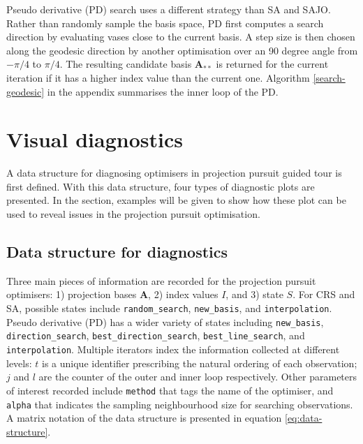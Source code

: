 Pseudo derivative (PD) search \citep{cook1995grand} uses a different
strategy than SA and SAJO. Rather than randomly sample the basis space,
PD first computes a search direction by evaluating vases close to the
current basis. A step size is then chosen along the geodesic direction
by another optimisation over an 90 degree angle from \(-\pi/4\) to
\(\pi/4\). The resulting candidate basis \(\mathbf{A}_{**}\) is returned
for the current iteration if it has a higher index value than the
current one. Algorithm \ref{search-geodesic} in the appendix summarises
the inner loop of the PD.

\hypertarget{vis-diag}{%
\section{Visual diagnostics}\label{vis-diag}}

A data structure for diagnosing optimisers in projection pursuit guided
tour is first defined. With this data structure, four types of
diagnostic plots are presented. In the section, examples will be given
to show how these plot can be used to reveal issues in the projection
pursuit optimisation.

\hypertarget{data-structure-for-diagnostics}{%
\subsection{Data structure for
diagnostics}\label{data-structure-for-diagnostics}}

Three main pieces of information are recorded for the projection pursuit
optimisers: 1) projection bases \(\mathbf{A}\), 2) index values \(I\),
and 3) state \(S\). For CRS and SA, possible states include
\texttt{random\_search}, \texttt{new\_basis}, and
\texttt{interpolation}. Pseudo derivative (PD) has a wider variety of
states including \texttt{new\_basis}, \texttt{direction\_search},
\texttt{best\_direction\_search}, \texttt{best\_line\_search}, and
\texttt{interpolation}. Multiple iterators index the information
collected at different levels: \(t\) is a unique identifier prescribing
the natural ordering of each observation; \(j\) and \(l\) are the
counter of the outer and inner loop respectively. Other parameters of
interest recorded include \texttt{method} that tags the name of the
optimiser, and \texttt{alpha} that indicates the sampling neighbourhood
size for searching observations. A matrix notation of the data structure
is presented in equation \ref{eq:data-structure}.

